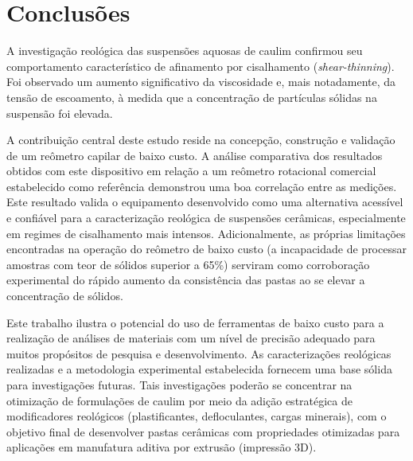 \documentclass[article,12pt,oneside,a4paper,english,brazil,sumario=tradicional]{abntex2}
\begin{document}
\section{Conclusões}
\label{sec:conclusoes}
A investigação reológica das suspensões aquosas de caulim confirmou seu comportamento característico de afinamento por cisalhamento (\textit{shear-thinning}). Foi observado um aumento significativo da viscosidade e, mais notadamente, da tensão de escoamento, à medida que a concentração de partículas sólidas na suspensão foi elevada.

A contribuição central deste estudo reside na concepção, construção e validação de um reômetro capilar de baixo custo. A análise comparativa dos resultados obtidos com este dispositivo em relação a um reômetro rotacional comercial estabelecido como referência demonstrou uma boa correlação entre as medições. Este resultado valida o equipamento desenvolvido como uma alternativa acessível e confiável para a caracterização reológica de suspensões cerâmicas, especialmente em regimes de cisalhamento mais intensos. Adicionalmente, as próprias limitações encontradas na operação do reômetro de baixo custo (a incapacidade de processar amostras com teor de sólidos superior a 65\%) serviram como corroboração experimental do rápido aumento da consistência das pastas ao se elevar a concentração de sólidos.

Este trabalho ilustra o potencial do uso de ferramentas de baixo custo para a realização de análises de materiais com um nível de precisão adequado para muitos propósitos de pesquisa e desenvolvimento. As caracterizações reológicas realizadas e a metodologia experimental estabelecida fornecem uma base sólida para investigações futuras. Tais investigações poderão se concentrar na otimização de formulações de caulim por meio da adição estratégica de modificadores reológicos (plastificantes, defloculantes, cargas minerais), com o objetivo final de desenvolver pastas cerâmicas com propriedades otimizadas para aplicações em manufatura aditiva por extrusão (impressão 3D).


\end{document}
